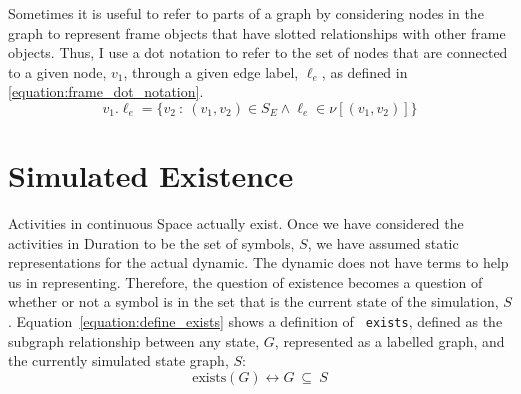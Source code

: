 Sometimes it is useful to refer to parts of a graph by considering
nodes in the graph to represent frame objects that have slotted
relationships with other frame objects.  Thus, I use a dot notation to
refer to the set of nodes that are connected to a given node, $v_1$,
through a given edge label, $\ell_e$, as defined in
{\mbox{\autoref{equation:frame_dot_notation}}}.
\begin{equation}
\label{equation:frame_dot_notation}
v_1.\ell_e = \{v_2 ~:~ (v_1, v_2) \in S_E \wedge \ell_e \in \nu[(v_1, v_2)]\}
\end{equation}

\section{Simulated Existence}

Activities in continuous Space actually exist.  Once we have
considered the activities in Duration to be the set of symbols, $S$,
we have assumed static representations for the actual dynamic.  The
dynamic does not have terms to help us in representing.  Therefore,
the question of existence becomes a question of whether or not a
symbol is in the set that is the current state of the simulation, $S$.
Equation~\ref{equation:define_exists} shows a definition of {\tt
  exists}, defined as the subgraph relationship between any state,
$G$, represented as a labelled graph, and the currently simulated
state graph, $S$:
\begin{equation}
\label{equation:define_exists}
\text{exists}(G) \longleftrightarrow G ~{\subseteq}~ S
\end{equation}





